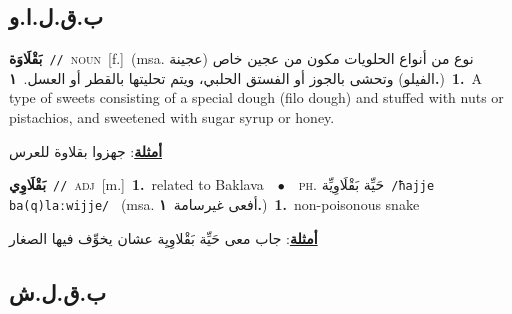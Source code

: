 \documentclass[10pt,a4paper,twoside]{article} %
\begin{document}
\begin{multicols}{2}
\vspace{-3mm}
\subsection*{\color{blue}\foreignlanguage{arabic}{ب.ق.ل.ا.و}\color{blue}{ (ntws)}} 

{\setlength\topsep{0pt}\textbf{\foreignlanguage{arabic}{بَقْلَاوَة}}\ {\color{gray}\texttt{//}\color{black}}\ \textsc{noun}\ [f.]\ \color{gray}(msa. \foreignlanguage{arabic}{نوع من أنواع الحلويات مكون من عجين خاص (عجينة الفيلو) وتحشى بالجوز أو الفستق الحلبي، ويتم تحليتها بالقطر أو العسل.}~\foreignlanguage{arabic}{\textbf{١.}})\color{black}\ \textbf{1.}~A type of sweets consisting of a special dough (filo dough) and stuffed with nuts or pistachios, and sweetened with sugar syrup or honey.\  \begin{flushright}\color{gray}\foreignlanguage{arabic}{\textbf{\underline{\foreignlanguage{arabic}{أمثلة}}}: جهزوا بقلاوة للعرس}\end{flushright}\color{black}} \vspace{2mm}

{\setlength\topsep{0pt}\textbf{\foreignlanguage{arabic}{بَقْلَاوِي}}\ {\color{gray}\texttt{//}\color{black}}\ \textsc{adj}\ [m.]\ \textbf{1.}~related to Baklava\ \ $\bullet$\ \ \textsc{ph.} \color{gray} \foreignlanguage{arabic}{حَيِّة بَقْلَاوِيِّة}\color{black}\ {\color{gray}\texttt{/{\sffamily ħajje ba(q)laːwijje}/}\color{black}}\ \color{gray} (msa. \foreignlanguage{arabic}{أفعى غيرسامة}~\foreignlanguage{arabic}{\textbf{١.}})\color{black}\ \textbf{1.}~non-poisonous snake\  \begin{flushright}\color{gray}\foreignlanguage{arabic}{\textbf{\underline{\foreignlanguage{arabic}{أمثلة}}}: جاب معى حَيِّة بَقْلاوِيِة عشان يخوِّف فيها الصغار}\end{flushright}\color{black}} \vspace{2mm}

\vspace{-3mm}
\subsection*{\color{blue}\foreignlanguage{arabic}{ب.ق.ل.ش}\color{blue}{}} 


\end{multicols}
\end{document}

